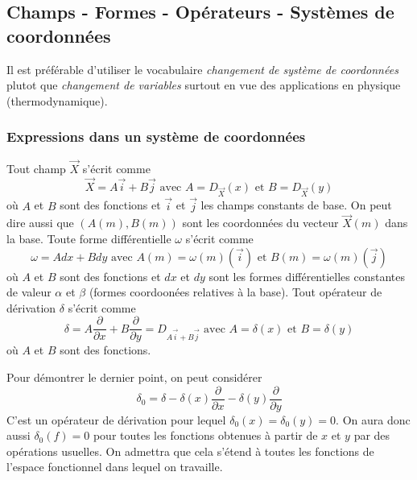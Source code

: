 \subsection{Champs - Formes - Opérateurs - Systèmes de coordonnées}
Il est préférable d'utiliser le vocabulaire \emph{changement de système de coordonnées} plutot que \emph{changement de variables} surtout en vue des applications en physique (thermodynamique).
\subsubsection{Expressions dans un système de coordonnées}
\begin{prop}
Tout champ $\overrightarrow X$ s'écrit comme
\begin{displaymath}
 \overrightarrow X = A \overrightarrow i + B \overrightarrow j \text{ avec }
A=D_{\overrightarrow X}(x) \text{ et } B=D_{\overrightarrow X}(y)
\end{displaymath}
où $A$ et $B$ sont des fonctions et $\overrightarrow i$ et $\overrightarrow j$ les champs constants de base. On peut dire aussi que $(A(m),B(m))$ sont les coordonnées du vecteur $\overrightarrow X(m)$ dans la base.\newline
Toute forme différentielle $\omega$ s'écrit comme
\begin{displaymath}
 \omega = Adx + Bdy \text{ avec } A(m)=\omega(m)(\overrightarrow i) \text{ et } B(m)=\omega(m)(\overrightarrow j)
\end{displaymath}
où $A$ et $B$ sont des fonctions et $dx$ et $dy$ sont les formes différentielles constantes de valeur $\alpha$ et $\beta$ (formes coordoonées relatives à la base).\newline
Tout opérateur de dérivation $\delta$ s'écrit comme
\begin{displaymath}
 \delta = A\dfrac{\partial}{\partial x} + B\dfrac{\partial}{\partial y}
= D_{A\overrightarrow i + B\overrightarrow j} \text{ avec } 
A=\delta(x) \text{ et } B=\delta(y)
\end{displaymath}
où $A$ et $B$ sont des fonctions. 
\end{prop}
\begin{demo}
 Pour démontrer le dernier point, on peut considérer 
\begin{displaymath}
 \delta_0 = \delta  - \delta(x)\dfrac{\partial}{\partial x} - \delta(y)\dfrac{\partial}{\partial y}
\end{displaymath}
C'est un opérateur de dérivation pour lequel $\delta_0(x)=\delta_0(y)=0$. On aura donc aussi $\delta_0(f)=0$ pour toutes les fonctions obtenues à partir de $x$ et $y$ par des opérations usuelles. On admettra que cela s'étend à toutes les fonctions de l'espace fonctionnel dans lequel on travaille.
\end{demo}


